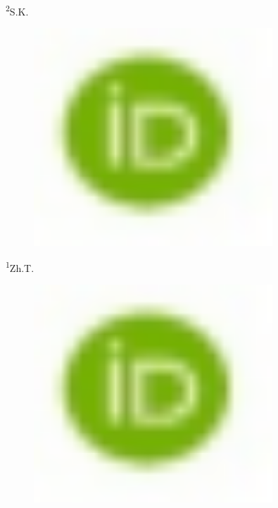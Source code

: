 \textsuperscript{2}S.K.
\begin{figure}[H]
	\centering
	\includegraphics[width=0.8\textwidth]{media/chem2/image16}
	\caption*{}
\end{figure}

\textsuperscript{1}Zh.T.
\begin{figure}[H]
	\centering
	\includegraphics[width=0.8\textwidth]{media/chem2/image16}
	\caption*{}
\end{figure}

